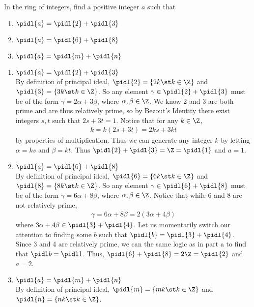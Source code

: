 \documentclass{article}
\begin{document}
In the ring of integers, find a positive integer \( a \) such that
\begin{enumerate}[label=\bd{\alph*.}]
  \item \( \pidl{a} = \pidl{2} + \pidl{3} \)
  \item \( \pidl{a} = \pidl{6} + \pidl{8} \)
  \item \( \pidl{a} = \pidl{m} + \pidl{n} \)
\end{enumerate}

\begin{solution} %
\begin{enumerate}[label=\bd{\alph*.}]
  \item \( \pidl{a} = \pidl{2} + \pidl{3} \) \\
    By definition of principal ideal, \( \pidl{2}=\{2k\st k\in\Z\} \) and \( \pidl{3}=\{3k\st k\in\Z\} \).
    So any element \(\gamma\in \pidl{2} + \pidl{3} \) must be of the form \( \gamma=2\alpha+3\beta \), where \( \alpha,\beta\in\Z \).
    We know 2 and 3 are both prime and are thus relatively prime, so by Bezout's Identity there exist integers \( s,t \) such that \( 2s+3t=1 \). Notice that for any \( k\in\Z \), \begin{align*}
      k = k(2s+3t) = 2ks+3kt
    \end{align*} by properties of multiplication.
    Thus we can generate any integer \( k \) by letting \( \alpha = ks \) and \( \beta = kt \).
    Thus \( \pidl{2}+\pidl{3} = \Z = \pidl{1} \) and \( a=1 \).
  \item \( \pidl{a} = \pidl{6} + \pidl{8} \) \\
    By definition of principal ideal, \( \pidl{6}=\{6k\st k\in\Z\} \) and \( \pidl{8}=\{8k\st k\in\Z\} \).
    So any element \(\gamma\in\pidl{6} + \pidl{8} \) must be of the form \( \gamma=6\alpha+8\beta \), where \( \alpha,\beta\in\Z \). Notice that while 6 and 8 are not relatively prime, \begin{align*}
      \gamma=6\alpha+8\beta= 2(3\alpha+4\beta)
    \end{align*} where \( 3\alpha+4\beta \in \pidl{3}+\pidl{4} \).
    Let us momentarily switch our attention to finding some \( b \) such that \(\pidl{b} = \pidl{3}+\pidl{4} \).
    Since 3 and 4 are relatively prime, we can the same logic as in part a to find that \( \pidl b = \pidl 1 \).
    Thus, \( \pidl{6}+\pidl{8} = 2\Z = \pidl{2} \) and \( a=2 \).
  \item \( \pidl{a} = \pidl{m} + \pidl{n} \) \\
    By definition of principal ideal, \( \pidl{m}=\{mk\st k\in\Z\} \) and \( \pidl{n}=\{nk\st k\in\Z\} \).

\end{enumerate}
\end{solution}
\end{document}

